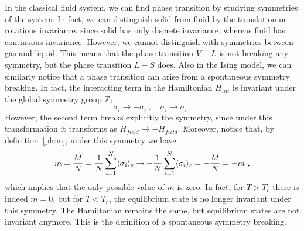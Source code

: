     In the classical fluid system, we can find phase transition by studying symmetries of the system. In fact, we can distinguish solid from fluid by the translation or rotations invariance, since solid has only discrete invariance, whereas fluid has continuous invariance. However, we cannot distinguish with symmetries between gas and liquid. This means that the phase transition $V-L$ is not breaking any symmetry, but the phase transition $L-S$ does. 
    Also in the Ising model, we can similarly notice that a phase transition can arise from a spontaneous symmetry breaking. In fact, the interacting term in the Hamiltonian $H_{int}$ is invariant under the global symmetry group $\mathbb Z_2$
    \begin{equation*}
        \sigma_i \rightarrow - \sigma_i ~, \quad \sigma_i \rightarrow \sigma_i ~.
    \end{equation*}
    However, the second term breaks explicitly the symmetry, since under this transformation it transforms as $H_{field} \rightarrow - H_{field}$. Moreover, notice that, by definition~\eqref{ph:m}, under this symmetry we have 
    \begin{equation}\label{ph:msymm}
        m = \frac{M}{N} = \frac{1}{N} \sum_{i=1}^N \langle\sigma_i\rangle_c \rightarrow - \frac{1}{N}\sum_{i=1}^N \langle\sigma_i\rangle_c = - \frac{M}{N} = - m ~,
    \end{equation} 
    which implies that the only possible value of $m$ is zero. In fact, for $T > T_c$ there is indeed $m=0$, but for $T < T_c$, the equilibrium state is no longer invariant under this symmetry. The Hamiltonian remains the same, but equilibrium states are not invariant anymore. This is the definition of a spontaneous symmetry breaking. 

